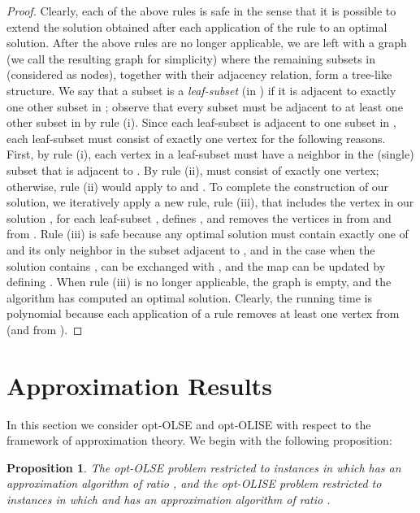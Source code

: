 \documentclass[11pt]{article}
\newtheorem{proposition}[theorem]{Proposition}
\begin{document}
\begin{proof}
Clearly, each of the above rules is safe in the sense that it is possible to extend the solution obtained after each application of the rule to an optimal solution. After the above rules are no longer applicable, we are left with a graph  (we call the resulting graph  for simplicity) where the remaining subsets in  (considered as nodes), together with their adjacency relation, form a tree-like structure.  We say that a subset  is a {\em leaf-subset} (in ) if it is adjacent to exactly one other subset in ; observe that every subset  must be adjacent to at least one other subset in  by rule (i). Since each leaf-subset is adjacent to one subset in , each leaf-subset must consist of exactly one vertex for the following reasons. First, by rule (i), each vertex in a leaf-subset  must have a neighbor in the (single) subset  that is adjacent to . By rule (ii),  must consist of exactly one vertex; otherwise, rule (ii) would apply to  and . To complete the construction of our solution, we iteratively apply a new rule, rule (iii), that includes the vertex  in our solution , for each leaf-subset , defines , and removes the vertices in  from  and  from . Rule (iii) is safe because any optimal solution must contain exactly one of  and its only neighbor  in the subset adjacent to , and in the case when the solution contains ,  can be exchanged with , and the map  can be updated by defining . When rule (iii) is no longer applicable, the graph  is empty, and the algorithm has computed an optimal solution.  Clearly, the running time is polynomial because each application of a rule removes at least one vertex from  (and from ). \end{proof}

\section{Approximation Results}\label{subsec:approximation}
In this section we consider opt-OLSE and opt-OLISE with respect to the framework of approximation theory. We begin with the following proposition:

\begin{proposition}\label{prop:apx}
The opt-OLSE problem restricted to instances in which  has an approximation algorithm of ratio , and the opt-OLISE problem restricted to instances in which  and  has an approximation algorithm of ratio .
\end{proposition}
\end{document}
